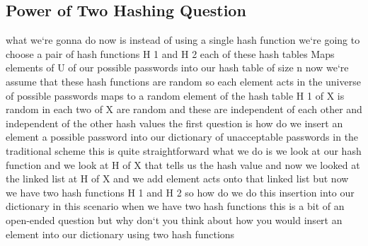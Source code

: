 \subsection{Power of Two Hashing Question}
what we`re gonna do now is instead of using a single hash function we`re going to choose a pair of hash functions H 1 and H 2 each of these hash tables Maps elements of U of our possible passwords into our hash table of size n now we`re assume that these hash functions are random so each element acts in the universe of possible passwords maps to a random element of the hash table H 1 of X is random in each two of X are random and these are independent of each other and independent of the other hash values the first question is how do we insert an element a possible password into our dictionary of unacceptable passwords in the traditional scheme this is quite straightforward what we do is we look at our hash function and we look at H of X that tells us the hash value and now we looked at the linked list at H of X and we add element acts onto that linked list but now we have two hash functions H 1 and H 2 so how do we do this insertion into our dictionary in this scenario when we have two hash functions this is a bit of an open-ended question but why don`t you think about how you would insert an element into our dictionary using two hash functions


